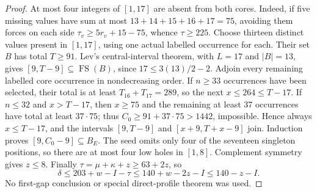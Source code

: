 \documentclass[11pt,letterpaper]{article}
\newcommand{\FS}{\operatorname{FS}}
\theoremstyle{definition}\newtheorem{definition}[theorem]{Definition}
\begin{document}
\begin{proof}
At most four integers of $[1,17]$ are absent from both cores. Indeed, if
five missing values have sum at most $13+14+15+16+17=75$, avoiding them
forces on each side $\tau_v\ge5r_v+15-75$, whence $\tau\ge225$.
Choose thirteen distinct values present in $[1,17]$, using one actual
labelled occurrence for each. Their set $B$ has total $T\ge91$.
Lev's central-interval theorem, with $L=17$ and $|B|=13$, gives
$[9,T-9]\subseteq\FS(B)$, since $17\le3(13)/2-2$.
Adjoin every remaining labelled core occurrence in nondecreasing order.
If $n\ge33$ occurrences have been selected, their total is at least
$T_{16}+T_{17}=289$, so the next $x\le264\le T-17$.
If $n\le32$ and $x>T-17$, then $x\ge75$ and the remaining at least
37 occurrences have total at least $37\cdot75$; thus
$C_0\ge91+37\cdot75>1442$, impossible.
Hence always $x\le T-17$, and the intervals
$[9,T-9]$ and $[x+9,T+x-9]$ join. Induction proves
$[9,C_0-9]\subseteq B_E$.
The seed omits only four of the seventeen singleton positions, so there
are at most four low holes in $[1,8]$. Complement symmetry gives $z\le8$.
Finally $\tau=\mu+\kappa+z\ge63+2z$, so
\[
\delta\le203+w-I-\tau\le140+w-2z-I\le140-z-I.
\]
No first-gap conclusion or special direct-profile theorem was used.
\end{proof}
\end{document}
